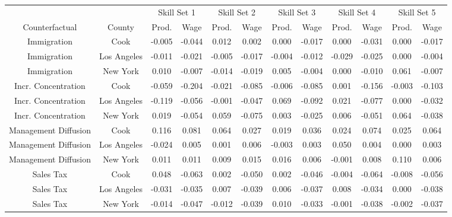 
\centering
\begin{tabular}[t]{cccccccccccc}
\toprule
\multicolumn{1}{c}{ } & \multicolumn{1}{c}{ } & \multicolumn{2}{c}{Skill Set 1} & \multicolumn{2}{c}{Skill Set 2} & \multicolumn{2}{c}{Skill Set 3} & \multicolumn{2}{c}{Skill Set 4} & \multicolumn{2}{c}{Skill Set 5} \\
\cmidrule(l{3pt}r{3pt}){3-4} \cmidrule(l{3pt}r{3pt}){5-6} \cmidrule(l{3pt}r{3pt}){7-8} \cmidrule(l{3pt}r{3pt}){9-10} \cmidrule(l{3pt}r{3pt}){11-12}
Counterfactual & County & Prod. & Wage & Prod. & Wage & Prod. & Wage & Prod. & Wage & Prod. & Wage\\
\midrule
Immigration & Cook & -0.005 & -0.044 & 0.012 & 0.002 & 0.000 & -0.017 & 0.000 & -0.031 & 0.000 & -0.017\\
Immigration & Los Angeles & -0.011 & -0.021 & -0.005 & -0.017 & -0.004 & -0.012 & -0.029 & -0.025 & 0.000 & -0.004\\
Immigration & New York & 0.010 & -0.007 & -0.014 & -0.019 & 0.005 & -0.004 & 0.000 & -0.010 & 0.061 & -0.007\\
Incr. Concentration & Cook & -0.059 & -0.204 & -0.021 & -0.085 & -0.006 & -0.085 & 0.001 & -0.156 & -0.003 & -0.103\\
Incr. Concentration & Los Angeles & -0.119 & -0.056 & -0.001 & -0.047 & 0.069 & -0.092 & 0.021 & -0.077 & 0.000 & -0.032\\
Incr. Concentration & New York & 0.019 & -0.054 & 0.059 & -0.075 & 0.003 & -0.025 & 0.006 & -0.051 & 0.064 & -0.038\\
Management Diffusion & Cook & 0.116 & 0.081 & 0.064 & 0.027 & 0.019 & 0.036 & 0.024 & 0.074 & 0.025 & 0.064\\
Management Diffusion & Los Angeles & -0.024 & 0.005 & 0.001 & 0.006 & -0.003 & 0.003 & 0.050 & 0.004 & 0.000 & 0.003\\
Management Diffusion & New York & 0.011 & 0.011 & 0.009 & 0.015 & 0.016 & 0.006 & -0.001 & 0.008 & 0.110 & 0.006\\
Sales Tax & Cook & 0.048 & -0.063 & 0.002 & -0.050 & 0.002 & -0.046 & -0.004 & -0.064 & -0.008 & -0.056\\
Sales Tax & Los Angeles & -0.031 & -0.035 & 0.007 & -0.039 & 0.006 & -0.037 & 0.008 & -0.034 & 0.000 & -0.038\\
Sales Tax & New York & -0.014 & -0.047 & -0.012 & -0.039 & 0.010 & -0.033 & -0.001 & -0.038 & -0.002 & -0.037\\
\bottomrule
\end{tabular}